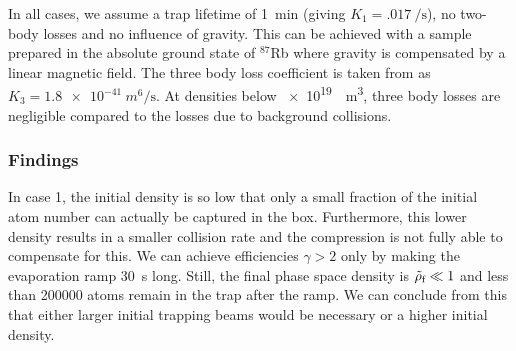In all cases, we assume a trap lifetime of \SI{1}{min} (giving $K_1 = \SI{.017}{\per\second}$), no two-body losses and no influence of gravity. This can be achieved with a sample prepared in the absolute ground state of $^{87}$Rb where gravity is compensated by a linear magnetic field. The three body loss coefficient is taken from \cite{threebody} as $K_3 = \SI{1.8e-41}{m^6\per\second}$. At densities below \SI{e19}{\per\meter\cubed}, three body losses are negligible compared to the losses due to background collisions.

\subsubsection*{Findings}
In case 1, the initial density is so low that only a small fraction of the initial atom number can actually be captured in the box. Furthermore, this lower density results in a smaller collision rate and the compression is not fully able to compensate for this. We can achieve efficiencies $\gamma > 2$ only by making the evaporation ramp \SI{30}{s} long. Still, the final phase space density is $\tilde{\rho}_\text{f}\ll 1$ and less than \num{200000} atoms remain in the trap after the ramp. We can conclude from this that either larger initial trapping beams would be necessary or a higher initial density.

